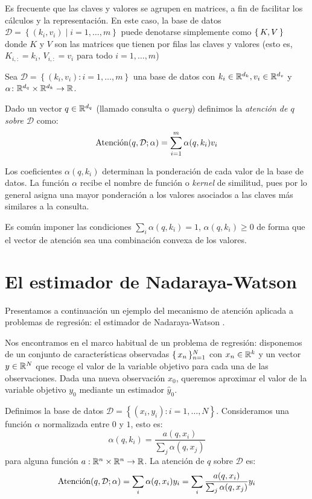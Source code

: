 Es frecuente que las claves y valores se agrupen en matrices, a fin de facilitar los cálculos y la representación. En este caso, la base de datos \( \mathcal{D} = \left\{ (k_i, v_i) \mid i = 1, …, m \right\} \) puede denotarse simplemente como \( \{\,K, V\,\} \) donde \( K \) y \( V \) son las matrices que tienen por filas las claves y valores (esto es, \( K_{i, :} = k_i\), \( V_{i, :} = v_i \) para todo \( i = 1, …, m\))

\begin{definition}[Atención] Sea \( \mathcal{D} = \left\{ (k_i, v_i) \colon i = 1, …, m \right\} \) una base de datos con \( k_i \in \mathbb{R}^{d_k}, v_i \in \mathbb{R}^{d_v}\) y \( \alpha \colon \mathbb{R}^{d_q} \times \mathbb{R}^{d_k} \to \mathbb{R} \).

Dado un vector \( q \in \mathbb{R}^{d_q} \) (llamado consulta o \textit{query}) definimos la \textit{atención de \( q \) sobre \( \mathcal{D} \)} como:
\[
\operatorname{Atenci\acute{o}n}(q, \mathcal{D}; \alpha) = \sum^m_{i = 1} \alpha(q, k_i) v_i
\]
\end{definition}

Los coeficientes \( \alpha(q, k_i) \) determinan la ponderación de cada valor de la base de datos. La función \( \alpha \) recibe el nombre de función o \textit{kernel} de similitud, pues por lo general asigna una mayor ponderación a los valores asociados a las claves más similares a la consulta.

Es común imponer las condiciones \( \sum_i \alpha(q, k_i) = 1 \), \( \alpha(q, k_i) \geq 0\) de forma que el vector de atención sea una combinación convexa de los valores.

\section{El estimador de Nadaraya-Watson}
Presentamos a continuación un ejemplo del mecanismo de atención aplicada a problemas de regresión: el estimador de Nadaraya-Watson \cite{watson1964smooth, nadaraya1964estimating}.

Nos encontramos en el marco habitual de un problema de regresión: disponemos de un conjunto de características observadas \( \{\,x_{n}\,\}_{n = 1}^N \) con \( x_{n}  \in \mathbb{R}^{k} \) y un vector \( y \in \mathbb{R}^{N} \) que recoge el valor de la variable objetivo para cada una de las observaciones. Dada una nueva observación \( x_{0} \), queremos aproximar el valor de la variable objetivo \( y_{0} \) mediante un estimador \( \widehat{y}_{0} \).

Definimos la base de datos \( \mathcal{D} = \left\{ (x_{i}, y_{i}) : i = 1, \dots, N \right\} \). Consideramos una función \( \alpha \) normalizada entre \( 0 \) y \( 1 \), esto es:
\[
    \alpha(q, k_{i}) = \frac{a(q, x_{i})}{\sum_j \alpha(q, x_{j}) }
\]
para alguna función \( a : \mathbb{R}^{n} \times \mathbb{R}^{n} \to \mathbb{R} \). La atención de \( q \) sobre \( \mathcal{D} \) es:
\[
    \operatorname{Atenci\acute{o}n}(q, \mathcal{D}; \alpha) = \sum_i  \alpha(q, x_{i}) y_{i} = \sum_i \frac{a(q, x_{i})}{\sum_j \alpha(q, x_{j})} y_{i}
\]

